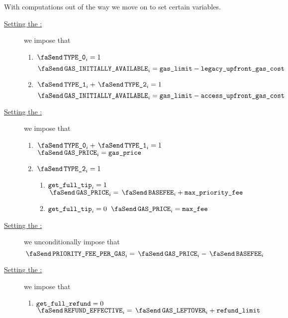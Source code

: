 \begin{center}
\end{center}
With computations out of the way we move on to set certain variables.
\begin{description}
        \item[\underline{Setting the \txInitialGas:}] 
                we impose that
                \begin{enumerate}
                        \item \If $\txIsLegacy _{i} = 1$ \Then
                                \[ \txInitialGas  _{i} = \locGasLimit - \locLegacyUpfrontGasCost \]
                        \item \If $\txIsAccessSet _{i} + \txIsTypeTwo _{i} = 1$ \Then
                                \[ \txInitialGas  _{i} = \locGasLimit - \locAccessUpfrontGasCost \]
                \end{enumerate}
        \item[\underline{Setting the \txGasPrice:}] 
                we impose that
                \begin{enumerate}
                        \item \If $\txIsLegacy _{i} + \txIsAccessSet _{i} = 1$ \Then $\txGasPrice  _{i} = \locGasPrice$
                        \item \If $\txIsTypeTwo_{i} = 1$ \Then
                                \begin{enumerate}
                                        \item \If $\texttt{get\_full\_tip}_{i} = 1$ \Then $\txGasPrice  _{i} = \txBasefee_{i} + \locMaxPriorityFee$
                                        \item \If $\texttt{get\_full\_tip}_{i} = 0$ \Then $\txGasPrice  _{i} = \locMaxFee$
                                \end{enumerate}
                \end{enumerate}
        \item[\underline{Setting the \txPriorityFeePerGas:}] 
                we unconditionally impose that
                \[
                        \txPriorityFeePerGas  _{i} = \txGasPrice_{i} - \txBasefee_{i}
                \]
        \item[\underline{Setting the \txEffectiveRefund:}]
                we impose that
                \begin{enumerate}
                        \item \If $\texttt{get\_full\_refund} = 0$ \Then $\txEffectiveRefund _{i} = \txLeftoverGas _{i} + \locRefundLimit$

\end{enumerate}
\end{description}
